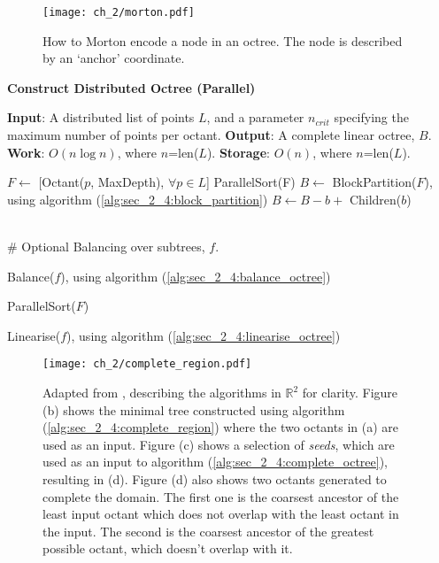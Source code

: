 \begin{figure}
    \centerline{\texttt{[image: ch\_2/morton.pdf]}}
    \caption{How to Morton encode a node in an octree. The node is described by an `anchor' coordinate.}
    \label{fig:sec_2_4:morton}
\end{figure}

\begin{algorithm}
    \caption{\textbf{Construct Distributed Octree (Parallel)}}
    \label{alg:sec_2_4:point2octree}
    \begin{algorithmic}
        \STATE \textbf{Input}: A distributed list of points $L$, and a parameter $n_{crit}$ specifying the maximum number of points per octant.
        \STATE \textbf{Output}: A complete linear octree, $B$. 
        \STATE \textbf{Work}: $O(n \log n)$, where $n$=len($L$).
        \STATE \textbf{Storage}: $O(n)$, where $n$=len($L$).
        
        \STATE $F \gets $ [Octant($p$, MaxDepth), $\forall p \in L$]
        \STATE ParallelSort(F)
        \STATE $B \gets $ BlockPartition($F$), using algorithm (\ref{alg:sec_2_4:block_partition})
                \STATE $B \gets B - b + $ Children($b$)
            \ENDIF
        \ENDFOR

        \STATE \\\# Optional Balancing over subtrees, $f$.

                \STATE Balance($f$), using algorithm (\ref{alg:sec_2_4:balance_octree})
            \ENDFOR

            \STATE ParallelSort($F$)
            
                \STATE Linearise($f$), using algorithm (\ref{alg:sec_2_4:linearise_octree})
            \ENDFOR
        \ENDIF

    \end{algorithmic}
\end{algorithm}

\begin{figure}
    \centerline{\texttt{[image: ch\_2/complete\_region.pdf]}}
    \caption{Adapted from \cite{sundar2008bottom}, describing the algorithms in $\mathbb{R}^2$ for clarity. Figure (b) shows the minimal tree constructed using algorithm (\ref{alg:sec_2_4:complete_region}) where the two octants in (a) are used as an input. Figure (c) shows a selection of \textit{seeds}, which are used as an input to algorithm (\ref{alg:sec_2_4:complete_octree}), resulting in (d). Figure (d) also shows two octants generated to complete the domain.  The first one is the coarsest ancestor of the least input octant which does not overlap with the least octant in the input. The second is the coarsest ancestor of the greatest possible octant, which doesn't overlap with it.}
    \label{fig:sec_2_4:complete}
\end{figure}

